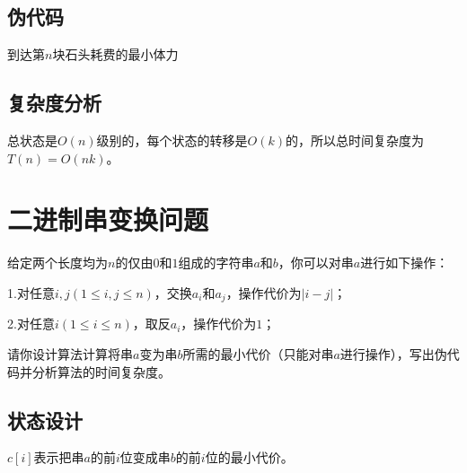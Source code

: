\documentclass{article}
\begin{document}
\subsection{伪代码}
\begin{algorithm}[H]

\caption{到达第$n$块石头耗费的最小体力}
\LinesNumbered
{}


\end{algorithm}

\subsection{复杂度分析}
总状态是$O(n)$级别的，每个状态的转移是$O(k)$的，所以总时间复杂度为$T(n)=O(nk)$。

\section{二进制串变换问题}

给定两个长度均为$n$的仅由$0$和$1$组成的字符串$a$和$b$，你可以对串$a$进行如下操作：

1.对任意$ i, j(1 \leq i, j \leq  n)$，交换$a_i$和$a_j$，操作代价为$|i − j|$；

2.对任意$ i(1 \leq  i \leq  n)$，取反$a_i$，操作代价为$1$；

请你设计算法计算将串$a$变为串$b$所需的最小代价（只能对串$a$进行操作），写出伪代码并分析算法的时间复杂度。
 

\subsection{状态设计}
$c[i]$表示把串$a$的前$i$位变成串$b$的前$i$位的最小代价。
\end{document}
